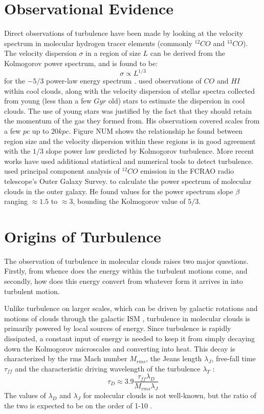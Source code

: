 \documentclass[12pt, preprint]{aastex}
\begin{document}
\section{Observational Evidence}
Direct observations of turbulence have been made by looking at the velocity
spectrum in molecular hydrogen tracer elements (commonly $^{12}CO$ and
$^{13}CO$). The velocity dispersion $\sigma$ in a region of size $L$ can be
derived from the Kolmogorov power spectrum, and is found to be:
$$\sigma \propto L^{1/3}$$
for the $-5/3$ power-law energy spectrum \citep{larson1979}.
\citet{larson1979} used observations of $CO$ and $HI$ within cool
clouds, along with the velocity dispersion of stellar spectra collected from
young (less than a few $Gyr$ old) stars to estimate the dispersion in cool clouds.  
The use of young stars was justified by the fact that they should retain the
momentum of the gas they formed from.  His
observatiosn covered scales from a few $pc$ up to $20 kpc$.  Figure NUM shows
the relationship he found between region size and the velocity dispersion
within these regions is in good agreement with the $1/3$ slope power law
predicted by Kolmogorov turbulence.
More recent works have used additional statistical and numerical tools to detect
turbulence.  \citet{brunt2003} used principal component analysis of $^{12}CO$
emission in the FCRAO radio telescope's Outer Galaxy Survey.  to calculate the
power spectrum of molecular clouds in the outer galaxy.  He found values for the
power spectrum slope $\beta$ ranging $\approx 1.5$ to $\approx 3$, bounding the
Kolmogorov value of $5/3$.
\section{Origins of Turbulence}
The observation of turbulence in molecular clouds raises two major questions.
Firstly, from whence does the energy within the turbulent motions come, and
secondly, how does this energy convert from whatever form it arrives in into 
turbulent motion.

Unlike turbulence on larger scales, which can be driven by galactic rotations
and motions of clouds through the galactic ISM \citep{balb1991}, turbulence in
molecular clouds is primarily powered by local sources of energy.  Since
turbulence is rapidly dissipated, a constant input of energy is needed to keep
it from simply decaying down the Kolmogorov microscales and converting into
heat.  This decay is characterized by the rms Mach number $M_{rms}$, the Jeans
length $\lambda_J$, free-fall time $\tau_{ff}$ and the characteristic driving 
wavelength of the turbulence $\lambda_T$ \citep{mac1999}:
$$ \tau_D \approx 3.9 \frac{\tau_{ff}\lambda_D}{M_{rms}\lambda_J}$$
The values of $\lambda_D$ and $\lambda_J$ for molecular clouds is not
well-known, but the ratio of the two is expected to be on the order of 1-10
\citep{mac2004}.
\end{document}
